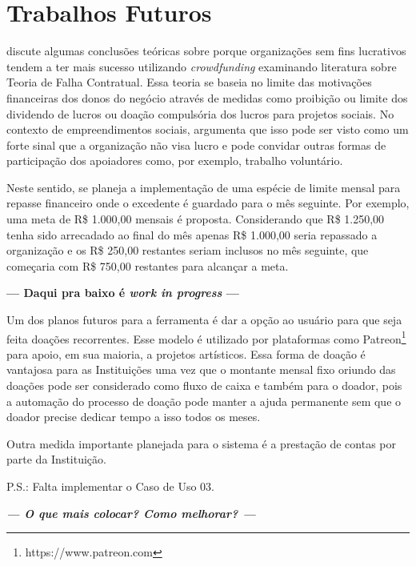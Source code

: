 \chapter{Trabalhos Futuros}

\citeauthor{belleflamme2010} discute algumas conclusões teóricas sobre porque organizações sem fins lucrativos tendem a ter mais sucesso utilizando \emph{crowdfunding} examinando literatura sobre Teoria de Falha Contratual. Essa teoria se baseia no limite das motivações financeiras dos donos do negócio através de medidas como proibição ou limite dos dividendo de lucros ou doação compulsória dos lucros para projetos sociais. No contexto de empreendimentos sociais, \citeauthor{lehner2013crowdfunding} argumenta que isso pode ser visto como um forte sinal que a organização não visa lucro e pode convidar outras formas de participação dos apoiadores como, por exemplo, trabalho voluntário.

Neste sentido, se planeja a implementação de uma espécie de limite mensal para repasse financeiro onde o excedente é guardado para o mês seguinte. Por exemplo, uma meta de R\$ 1.000,00 mensais é proposta. Considerando que R\$ 1.250,00 tenha sido arrecadado ao final do mês apenas R\$ 1.000,00 seria repassado a organização e os R\$ 250,00 restantes seriam inclusos no mês seguinte, que começaria com R\$ 750,00 restantes para alcançar a meta.

\textbf{--- Daqui pra baixo é \textit{work in progress} ---}

Um dos planos futuros para a ferramenta é dar a opção ao usuário para que seja feita doações recorrentes. Esse modelo é utilizado por plataformas como Patreon\footnote{https://www.patreon.com} para apoio, em sua maioria, a projetos artísticos. Essa forma de doação é vantajosa para as Instituições uma vez que o montante mensal fixo oriundo das doações pode ser considerado como fluxo de caixa e também para o doador, pois a automação do processo de doação pode manter a ajuda permanente sem que o doador precise dedicar tempo a isso todos os meses.

Outra medida importante planejada para o sistema é a prestação de contas por parte da Instituição.

P.S.: Falta implementar o Caso de Uso 03.

\textbf{\textit{--- O que mais colocar? Como melhorar? ---}}
